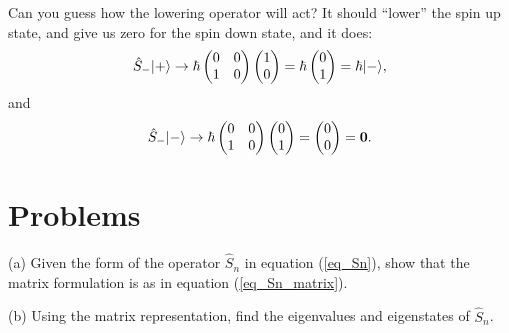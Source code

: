 Can you guess how the lowering operator will act?  It should ``lower'' the spin up state, and give us zero for the spin down state, and it does:
\[
\hat{S}_- | + \rangle \to \hbar \begin{pmatrix} 0 & 0 \\ 1 & 0 \end{pmatrix} \begin{pmatrix} 1 \\ 0 \end{pmatrix} = \hbar \begin{pmatrix} 0 \\ 1 \end{pmatrix} = \hbar | - \rangle,
\]
and
\[
\hat{S}_- | - \rangle \to \hbar \begin{pmatrix} 0 & 0 \\ 1 & 0 \end{pmatrix} \begin{pmatrix} 0 \\ 1 \end{pmatrix} = \begin{pmatrix} 0 \\ 0 \end{pmatrix} = \mathbf{0}.
\]

\section*{Problems}
%

\begin{problem}
\label{prob_Sn}

(a) Given the form of the operator $\hat{S}_n$ in equation (\ref{eq_Sn}), show that the matrix formulation is as in equation (\ref{eq_Sn_matrix}).

(b) Using the matrix representation, find the eigenvalues and eigenstates of $\hat{S}_n$.
\end{problem}

